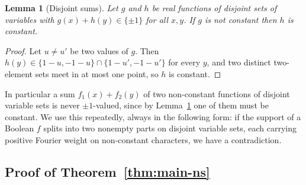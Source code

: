 \documentclass[11pt,reqno]{amsart}
\theoremstyle{plain}
\newtheorem{lemma}[theorem]{Lemma}
\theoremstyle{definition}
\numberwithin{theorem}{section}
\begin{document}
\begin{lemma}[Disjoint sums]\label{lem:C}
Let $g$ and $h$ be real functions of disjoint sets of variables with $g(x) + h(y) \in \{\pm1\}$
for all $x, y$. If $g$ is not constant then $h$ is constant.
\end{lemma}

\begin{proof}
Let $u \ne u'$ be two values of $g$. Then $h(y) \in \{1-u, -1-u\} \cap \{1-u', -1-u'\}$ for
every $y$, and two distinct two-element sets meet in at most one point, so $h$ is constant.
\end{proof}

In particular a sum $f_1(x) + f_2(y)$ of two non-constant functions of disjoint variable sets is
never $\pm1$-valued, since by Lemma~\ref{lem:C} one of them must be constant. We use this
repeatedly, always in the following form: if the support of a Boolean $f$ splits into two
nonempty parts on disjoint variable sets, each carrying positive Fourier weight on
non-constant characters, we have a contradiction.

\subsection{Proof of Theorem~\ref{thm:main-ns}}
\end{document}
